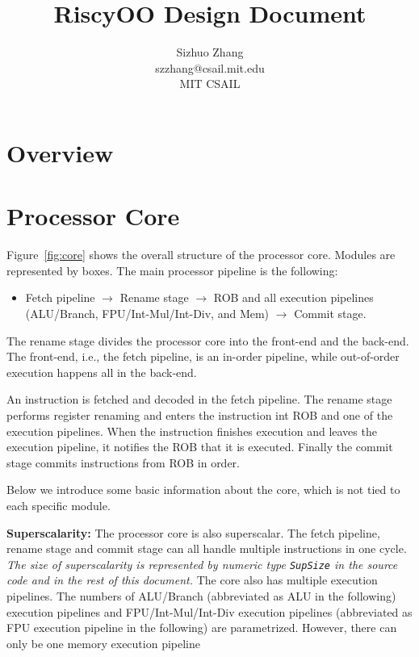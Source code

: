 \documentclass[12pt]{article}
\newcommand{\code}[1]{\texttt{#1}}
\begin{document}
\title{RiscyOO Design Document}
\author{Sizhuo Zhang \\ szzhang@csail.mit.edu \\ MIT CSAIL}
\date{}
\maketitle

\section{Overview}


\section{Processor Core}

Figure~\ref{fig:core} shows the overall structure of the processor core.
Modules are represented by boxes.
The main processor pipeline is the following:
\begin{itemize}
    \item Fetch pipeline $\rightarrow$ Rename stage $\rightarrow$ ROB and all execution pipelines (ALU/Branch, FPU/Int-Mul/Int-Div, and Mem) $\rightarrow$ Commit stage.
\end{itemize}
The rename stage divides the processor core into the front-end and the back-end.
The front-end, i.e., the fetch pipeline, is an in-order pipeline, while out-of-order execution happens all in the back-end.

An instruction is fetched and decoded in the fetch pipeline.
The rename stage performs register renaming and enters the instruction int ROB and one of the execution pipelines.
When the instruction finishes execution and leaves the execution pipeline, it notifies the ROB that it is executed.
Finally the commit stage commits instructions from ROB in order.

Below we introduce some basic information about the core, which is not tied to each specific module.

\noindent\textbf{Superscalarity:}
The processor core is also superscalar.
The fetch pipeline, rename stage and commit stage can all handle multiple instructions in one cycle.
\emph{The size of superscalarity is represented by numeric type \code{SupSize} in the source code and in the rest of this document.}
The core also has multiple execution pipelines.
The numbers of ALU/Branch (abbreviated as ALU in the following) execution pipelines and FPU/Int-Mul/Int-Div execution pipelines (abbreviated as FPU execution pipeline in the following) are parametrized.
However, there can only be one memory execution pipeline
\end{document}
